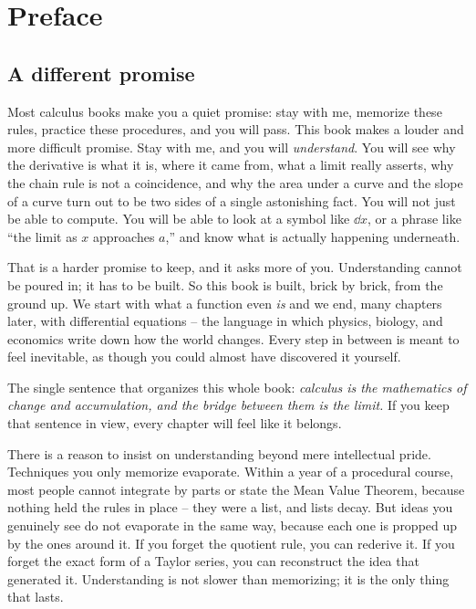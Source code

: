 \chapter*{Preface}

\section*{A different promise}

Most calculus books make you a quiet promise: stay with me, memorize these rules, practice these
procedures, and you will pass. This book makes a louder and more difficult promise. Stay with me,
and you will \emph{understand}. You will see why the derivative is what it is, where it came from,
what a limit really asserts, why the chain rule is not a coincidence, and why the area under a curve
and the slope of a curve turn out to be two sides of a single astonishing fact. You will not just be
able to compute. You will be able to look at a symbol like $\dd x$, or a phrase like ``the limit as
$x$ approaches $a$,'' and know what is actually happening underneath.

That is a harder promise to keep, and it asks more of you. Understanding cannot be poured in; it has
to be built. So this book is built, brick by brick, from the ground up. We start with what a
function even \emph{is} and we end, many chapters later, with differential equations -- the
language in which physics, biology, and economics write down how the world changes. Every step in
between is meant to feel inevitable, as though you could almost have discovered it yourself.

\begin{focusbox}
The single sentence that organizes this whole book: \emph{calculus is the mathematics of change and
accumulation, and the bridge between them is the limit.} If you keep that sentence in view, every
chapter will feel like it belongs.
\end{focusbox}

There is a reason to insist on understanding beyond mere intellectual pride. Techniques you only
memorize evaporate. Within a year of a procedural course, most people cannot integrate by parts or
state the Mean Value Theorem, because nothing held the rules in place -- they were a list, and lists
decay. But ideas you genuinely see do not evaporate in the same way, because each one is propped up
by the ones around it. If you forget the quotient rule, you can rederive it. If you forget the exact
form of a Taylor series, you can reconstruct the idea that generated it. Understanding is not slower
than memorizing; it is the only thing that lasts.

